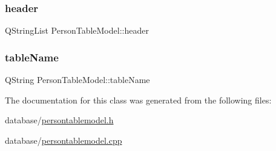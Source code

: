 \subsubsection{\texorpdfstring{header}{header}}
{\footnotesize\ttfamily Q\+String\+List Person\+Table\+Model\+::header\hspace{0.3cm}{\ttfamily [private]}}

\mbox{\label{class_person_table_model_aa9eec9359f87a39d2234dcaa324287d3}} 
\subsubsection{\texorpdfstring{tableName}{tableName}}
{\footnotesize\ttfamily Q\+String Person\+Table\+Model\+::table\+Name\hspace{0.3cm}{\ttfamily [private]}}



The documentation for this class was generated from the following files\+:\begin{DoxyCompactItemize}
\item 
database/\mbox{\hyperlink{persontablemodel_8h}{persontablemodel.\+h}}\item 
database/\mbox{\hyperlink{persontablemodel_8cpp}{persontablemodel.\+cpp}}\end{DoxyCompactItemize}
